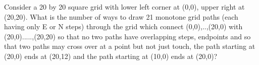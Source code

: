 Consider a 20 by 20 square grid with lower left corner at (0,0), upper right at (20,20). What is the number of ways to draw 21 monotone grid paths (each having only E or N steps) through the grid which connect (0,0),..,(20,0) with (20,0).....,(20,20) so that no two paths have overlapping steps, endpoints and so that two paths may cross over at a point but not just touch, the path starting at (20,0) ends at (20,12) and the path starting at (10,0) ends at (20,0)?
